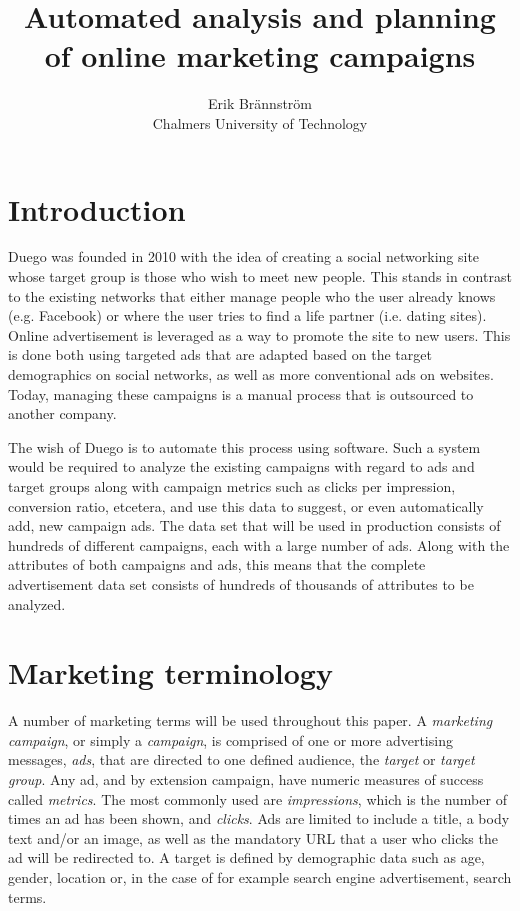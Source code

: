 \documentclass[a4paper]{article}
\begin{document}
\title{Automated analysis and planning of online marketing campaigns}
\author{Erik Brännström\\
  Chalmers University of Technology}
\date{}
\maketitle

\section{Introduction}
Duego was founded in 2010 with the idea of creating a social networking site whose target group is those who wish to meet new
people. This stands in contrast to the existing networks that either manage people who the user already knows (e.g. Facebook)
or where the user tries to find a life partner (i.e. dating sites). Online advertisement is leveraged as a way to promote the
site to new users. This is done both using targeted ads that are adapted based on the target demographics on social networks,
as well as more conventional ads on websites. Today, managing these campaigns is a manual process that is outsourced to
another company.

The wish of Duego is to automate this process using software. Such a system would be required to analyze the existing campaigns
with regard to ads and target groups along with campaign metrics such as clicks per impression, conversion ratio, etcetera, and
use this data to suggest, or even automatically add, new campaign ads. The data set that will be used in production consists of
hundreds of different campaigns, each with a large number of ads. Along with the attributes of both campaigns and ads, this means
that the complete advertisement data set consists of hundreds of thousands of attributes to be analyzed.

\section{Marketing terminology}
A number of marketing terms will be used throughout this paper. A \emph{marketing campaign}, or simply a \emph{campaign},
is comprised of one or more advertising messages, \emph{ads}, that are directed to one defined audience, the \emph{target} or 
\emph{target group}. Any ad, and by extension campaign, have numeric measures of success called \emph{metrics}. The most commonly
used are \emph{impressions}, which is the number of times an ad has been shown, and \emph{clicks}. Ads are limited to include a 
title, a body text and/or an image, as well as the mandatory URL that a user who clicks the ad will be redirected to. A target
is defined by demographic data such as age, gender, location or, in the case of for example search engine advertisement, search
terms.
\end{document}

